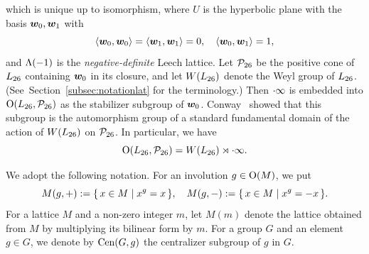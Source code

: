 \documentclass{amsart} %
\begin{document}
which is unique up to isomorphism,
where $U$ is the hyperbolic plane with the basis $\boldsymbol{w}_0, \boldsymbol{w}_1$
with
%
\begin{equation}\label{eq:w0w1}
\langle \boldsymbol{w}_0, \boldsymbol{w}_0 \rangle=\langle \boldsymbol{w}_1, \boldsymbol{w}_1 \rangle=0, 
\quad \langle \boldsymbol{w}_0, \boldsymbol{w}_1 \rangle=1, 
\end{equation}
and $\Lambda(-1)$ is the \emph{negative-definite} Leech lattice.
Let $\mathord{\mathcal{P}}_{26}$ be 
the positive cone  of $L_{26}$ containing $\boldsymbol{w}_0$ in its closure, 
and 
let $W(L_{26})$ denote the Weyl group of $L_{26}$.
(See~Section~\ref{subsec:notationlat} for the terminology.)
Then $\cdot \infty$ is embedded into $\mathord{\mathrm{O}}(L_{26}, \mathord{\mathcal{P}}_{26})$
as the stabilizer subgroup of $\boldsymbol{w}_0$.
Conway~\cite{MR690711} showed that 
 this subgroup is
the automorphism group
of a standard fundamental domain of the action of $W(L_{26})$ on $\mathord{\mathcal{P}}_{26}$.
In particular,  we have 
\[
\mathord{\mathrm{O}}(L_{26}, \mathord{\mathcal{P}}_{26})= W(L_{26}) \rtimes\cdot \infty.
\]
\par
%
We adopt the following notation.
For  an involution $g\in  \mathord{\mathrm{O}}(M)$, we put
%
\begin{equation}\label{eq:Mgpm}
M(g, +):=\{\,{x\in M}\mid {x^g=x} \,\},
\quad
M(g, -):=\{\,{x\in M}\mid {x^g=-x} \,\}.
\end{equation}
%
For a lattice $M$ and a non-zero integer $m$,
let  $M(m)$ denote the lattice obtained from $M$ by multiplying its bilinear form by
$m$.
For a group $G$ and an element $g\in G$,
we denote by $\mathrm{Cen}(G, g)$ the centralizer subgroup of $g$ in $G$.
%
%
\end{document}
